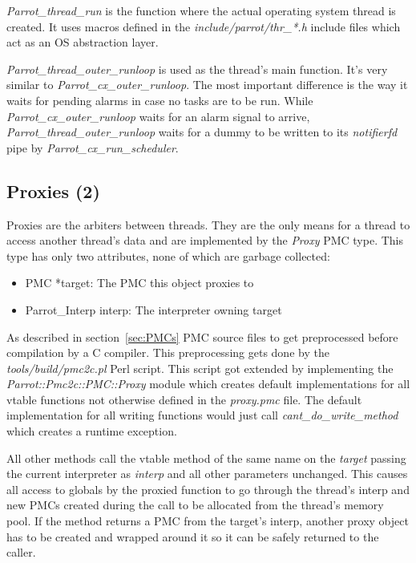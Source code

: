 \documentclass[bachelor,english]{hgbthesis}
\begin{document}
\textit{Parrot\_thread\_run} is the function where the actual operating system thread is created. It uses macros defined in the \textit{include/parrot/thr\_*.h} include files which act as an OS abstraction layer.

\textit{Parrot\_thread\_outer\_runloop} is used as the thread's main function. It's very similar to \textit{Parrot\_cx\_outer\_runloop}. The most important difference is the way it waits for pending alarms in case no tasks are to be run. While \textit{Parrot\_cx\_outer\_runloop} waits for an alarm signal to arrive, \textit{Parrot\_thread\_outer\_runloop} waits for a dummy to be written to its \textit{notifierfd} pipe by \textit{Parrot\_cx\_run\_scheduler}.

\subsection{Proxies (2)}

Proxies are the arbiters between threads. They are the only means for a thread to access another thread's data and are implemented by the \textit{Proxy} PMC type. This type has only two attributes, none of which are garbage collected:
%
\begin{itemize}
\item PMC *target: The PMC this object proxies to
\item Parrot\_Interp interp: The interpreter owning target
\end{itemize}

As described in section~\ref{sec:PMCs} PMC source files to get preprocessed before compilation by a C compiler. This preprocessing gets done by the \textit{tools/build/pmc2c.pl} Perl script. This script got extended by implementing the \textit{Parrot::Pmc2c::PMC::Proxy} module which creates default implementations for all vtable functions not otherwise defined in the \textit{proxy.pmc} file. The default implementation for all writing functions would just call \textit{cant\_do\_write\_method} which creates a runtime exception.

All other methods call the vtable method of the same name on the \textit{target} passing the current interpreter as \textit{interp} and all other parameters unchanged. This causes all access to globals by the proxied function to go through the thread's interp and new PMCs created during the call to be allocated from the thread's memory pool. If the method returns a PMC from the target's interp, another proxy object has to be created and wrapped around it so it can be safely returned to the caller.
\end{document}
